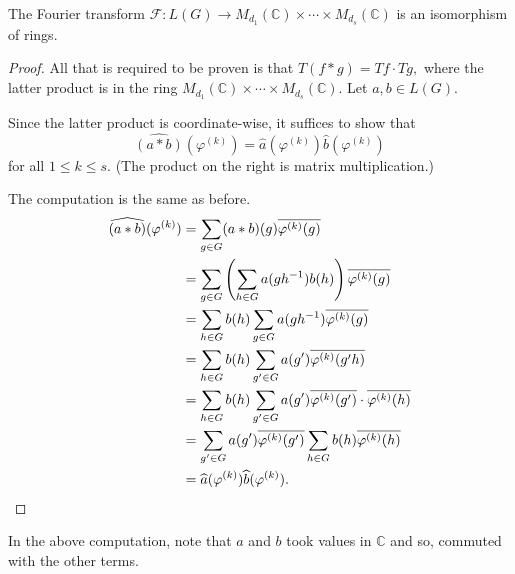 \begin{thm}[Wedderburn]
    The Fourier transform $\mathcal{F} : L(G) \to M_{d_1}(\mathbb{C}) \times \cdots \times M_{d_s}(\mathbb{C})$ is an isomorphism of rings.
\end{thm}
\begin{proof} 
    All that is required to be proven is that $T(f * g) = Tf \cdot Tg,$ where the latter product is in the ring $M_{d_1}(\mathbb{C}) \times \cdots \times M_{d_s}(\mathbb{C}).$ Let $a, b \in L(G).$

    Since the latter product is coordinate-wise, it suffices to show that
    \begin{equation*} 
        \widehat{(a * b)}(\varphi^{(k)}) = \widehat{a}(\varphi^{(k)})\widehat{b}(\varphi^{(k)})
    \end{equation*}
    for all $1 \le k \le s.$ (The product on the right is matrix multiplication.)

    The computation is the same as before.
    \begin{align*} 
        \widehat{(a * b)}(\varphi^{(k)}) &= \sum_{g \in G} (a * b)(g)\overline{\varphi^{(k)}(g)}\\
        &= \sum_{g \in G}\left(\sum_{h \in G}a(gh^{-1})b(h)\right)\overline{\varphi^{(k)}(g)}\\
        &= \sum_{h \in G}b(h)\sum_{g \in G}a(gh^{-1})\overline{\varphi^{(k)}(g)}\\
        &= \sum_{h \in G}b(h)\sum_{g' \in G}a(g')\overline{\varphi^{(k)}(g'h)}\\
        &= \sum_{h \in G}b(h)\sum_{g' \in G}a(g')\overline{\varphi^{(k)}(g')}\cdot\overline{\varphi^{(k)}(h)}\\
        &= \sum_{g' \in G}a(g')\overline{\varphi^{(k)}(g')}\sum_{h \in G}b(h)\overline{\varphi^{(k)}(h)}\\
        &= \widehat{a}(\varphi^{(k)})\widehat{b}(\varphi^{(k)}). \qedhere
    \end{align*}
\end{proof}
In the above computation, note that $a$ and $b$ took values in $\mathbb{C}$ and so, commuted with the other terms.